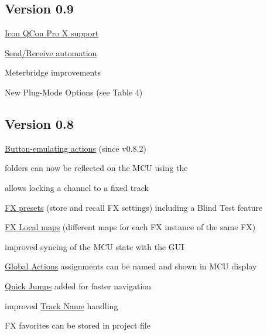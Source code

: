 \subsection{Version 0.9}
\begin{compactitem}
\item \hyperref[prox]{Icon QCon Pro X support}
\item \hyperref[sendautomation]{Send/Receive automation}
\item Meterbridge improvements
\item New Plug-Mode Options (see Table 4)
\end{compactitem}

\subsection{Version 0.8}
\begin{compactitem}
\item \hyperref[buttonactions]{Button-emulating actions} (since v0.8.2)
\item \reaper folders can now be reflected on the MCU using the \foldermode
\item \anchors allows locking a channel to a fixed track
\item \hyperref[fxpresets]{FX presets} (store and recall FX settings) including
  a Blind Test feature
\item \hyperref[localmaps]{FX Local maps} (different maps for each FX
  instance of the same FX)
\item improved syncing of the MCU state with the \reaper GUI
\item \hyperref[globalactions]{Global Actions} assignments can be named and
  shown in MCU display
\item \hyperref[quickjump]{Quick Jumps} added for faster navigation
\item improved \hyperref[tracknames]{Track Name} handling
\item FX favorites can be stored in \reaper project file
\end{compactitem}

